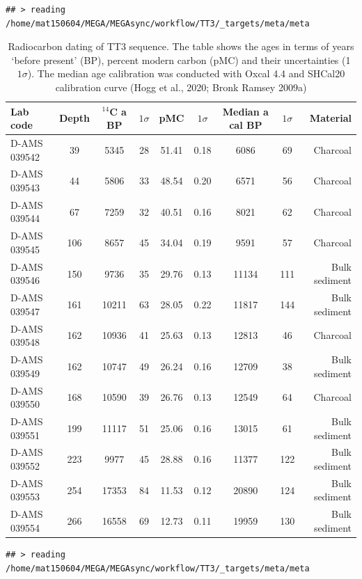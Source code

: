 \documentclass[
]{article}
\begin{document}
\begin{verbatim}
## > reading /home/mat150604/MEGA/MEGAsync/workflow/TT3/_targets/meta/meta
\end{verbatim}

\begin{table}[!h]
\caption{Radiocarbon dating of TT3 sequence. The table shows the ages in terms of years `before present' (BP), percent modern carbon (pMC) and their uncertainties (1 $1\sigma$).
      The median age calibration was conducted with Oxcal 4.4 and SHCal20 calibration curve (Hogg et al., 2020; Bronk Ramsey 2009a)}
\centering
\fontsize{7}{9}\selectfont
\begin{tabular}[t]{lcccccccr}
\toprule
Lab code & Depth & $^{14}$C a BP & $1\sigma$ & pMC & $1\sigma$ & Median a cal BP & $1\sigma$ & Material\\
\midrule
D-AMS 039542 & 39 & 5345 & 28 & 51.41 & 0.18 & 6086 & 69 & Charcoal\\
D-AMS 039543 & 44 & 5806 & 33 & 48.54 & 0.20 & 6571 & 56 & Charcoal\\
D-AMS 039544 & 67 & 7259 & 32 & 40.51 & 0.16 & 8021 & 62 & Charcoal\\
D-AMS 039545 & 106 & 8657 & 45 & 34.04 & 0.19 & 9591 & 57 & Charcoal\\
D-AMS 039546 & 150 & 9736 & 35 & 29.76 & 0.13 & 11134 & 111 & Bulk sediment\\
D-AMS 039547 & 161 & 10211 & 63 & 28.05 & 0.22 & 11817 & 144 & Bulk sediment\\
D-AMS 039548 & 162 & 10936 & 41 & 25.63 & 0.13 & 12813 & 46 & Charcoal\\
D-AMS 039549 & 162 & 10747 & 49 & 26.24 & 0.16 & 12709 & 38 & Bulk sediment\\
D-AMS 039550 & 168 & 10590 & 39 & 26.76 & 0.13 & 12549 & 64 & Charcoal\\
D-AMS 039551 & 199 & 11117 & 51 & 25.06 & 0.16 & 13015 & 61 & Bulk sediment\\
D-AMS 039552 & 223 & 9977 & 45 & 28.88 & 0.16 & 11377 & 122 & Bulk sediment\\
D-AMS 039553 & 254 & 17353 & 84 & 11.53 & 0.12 & 20890 & 124 & Bulk sediment\\
D-AMS 039554 & 266 & 16558 & 69 & 12.73 & 0.11 & 19959 & 130 & Bulk sediment\\
\bottomrule
\end{tabular}
\end{table}

\begin{verbatim}
## > reading /home/mat150604/MEGA/MEGAsync/workflow/TT3/_targets/meta/meta
\end{verbatim}
\end{document}
